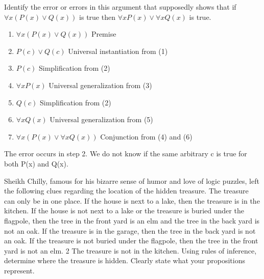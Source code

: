 \documentclass[a4paper]{exam}
\begin{document}
\begin{questions}
  \question  Identify the error or errors in this argument that supposedly shows that if $\forall x(P(x) \lor Q(x))$ is true then $\forall x P(x) \lor \forall x Q(x)$ is true.
\begin{enumerate}
    \item $\forall x(P(x) \lor Q(x))$ \hfill Premise
    \item $P(c) \lor Q(c)$ \hfill Universal instantiation from (1)
    \item $P(c)$ \hfill Simplification from (2)
    \item $\forall x P(x)$ \hfill Universal generalization from (3)
    \item $Q(c)$ \hfill Simplification from (2)
    \item $\forall x Q(x)$ \hfill Universal generalization from (5)
    \item $\forall x(P(x) \lor \forall x Q(x))$ \hfill Conjunction from (4) and (6)
\end{enumerate}
  \begin{solution}
    
    The error occurs in step 2. We do not know if the same arbitrary c is true for both P(x) and Q(x).
  \end{solution}
  
  \question Sheikh Chilly, famous for his bizarre sense of humor and love of logic puzzles, left the following clues regarding the location of the hidden treasure. The treasure can only be in one place. If the house is next to a lake, then the treasure is in the kitchen. If the house is not next to a lake or the treasure is buried under the flagpole, then the tree in the front yard is an elm and the tree in the back yard is not an oak. If the treasure is in the garage, then the tree in the back yard is not an oak.  If the treasure is not buried under the flagpole, then the tree in the front yard is not an elm. 2 The treasure is not in the kitchen. Using rules of inference, determine where the treasure is hidden. Clearly state what your propositions represent.
  \begin{solution}
    

\end{solution}
\end{questions}
\end{document}
